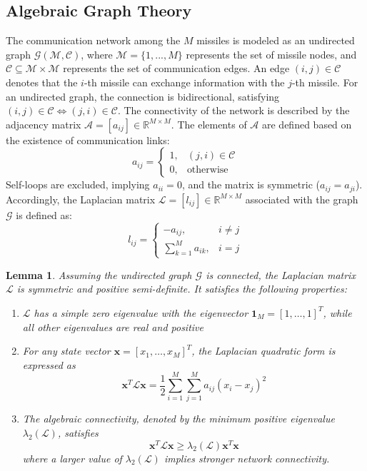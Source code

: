 \documentclass[lettersize,journal]{IEEEtran}
\newtheorem{lemma}{Lemma}
\begin{document}
\subsection{Algebraic Graph Theory}
The communication network among the $M$ missiles is modeled as an undirected graph $\mathcal{G}(\mathcal{M}, \mathcal{C})$, where $\mathcal{M}=\{1, ..., M\}$ represents the set of missile nodes, and $\mathcal{C} \subseteq \mathcal{M} \times \mathcal{M}$ represents the set of communication edges. An edge $(i, j) \in \mathcal{C}$ denotes that the $i$-th missile can exchange information with the $j$-th missile. For an undirected graph, the connection is bidirectional, satisfying $(i, j) \in \mathcal{C} \Leftrightarrow (j, i) \in \mathcal{C}$. The connectivity of the network is described by the adjacency matrix $\mathcal{A}=[a_{ij}] \in \mathbb{R}^{M \times M}$. The elements of $\mathcal{A}$ are defined based on the existence of communication links:
\begin{equation}
	a_{ij} =
	\begin{cases}
		1, & (j, i) \in \mathcal{C} \\
		0, & \text{otherwise}
	\end{cases}
\end{equation}
Self-loops are excluded, implying $a_{ii}=0$, and the matrix is symmetric ($a_{ij}=a_{ji}$). Accordingly, the Laplacian matrix $\mathcal{L}=[l_{ij}] \in \mathbb{R}^{M \times M}$ associated with the graph $\mathcal{G}$ is defined as:
\begin{equation}
	l_{ij} =
	\begin{cases}
		-a_{ij}, & i \neq j \\
		\sum_{k=1}^{M} a_{ik}, & i = j
	\end{cases}
\end{equation}
\begin{lemma}
	Assuming the undirected graph $\mathcal{G}$ is connected, the Laplacian matrix $\mathcal{L}$ is symmetric and positive semi-definite. It satisfies the following properties:
	\begin{enumerate}
		\item $\mathcal{L}$ has a simple zero eigenvalue with the eigenvector $\mathbf{1}_M = [1, \dots, 1]^T$, while all other eigenvalues are real and positive		
		\item For any state vector $\mathbf{x} = [x_1, \dots, x_M]^T$, the Laplacian quadratic form is expressed as
		\begin{equation}
			\mathbf{x}^T \mathcal{L} \mathbf{x} = \frac{1}{2} \sum_{i=1}^{M} \sum_{j=1}^{M} a_{ij} (x_i - x_j)^2
		\end{equation}		
		\item The algebraic connectivity, denoted by the minimum positive eigenvalue $\lambda_2(\mathcal{L})$, satisfies
		\begin{equation}
			\mathbf{x}^T \mathcal{L} \mathbf{x} \ge \lambda_2(\mathcal{L}) \mathbf{x}^T \mathbf{x}
		\end{equation}
		where a larger value of $\lambda_2(\mathcal{L})$ implies stronger network connectivity.
	\end{enumerate}
\end{lemma}
\end{document}
